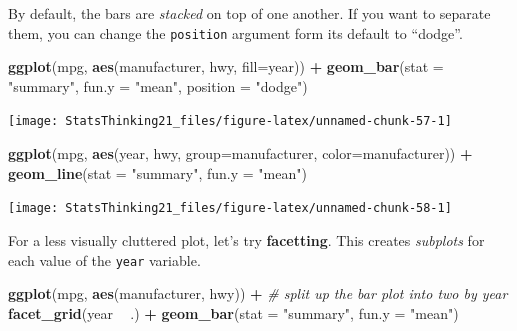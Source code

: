 \documentclass[12pt,]{book}
\newenvironment{Shaded}{\begin{snugshade}}{\end{snugshade}}
\newcommand{\CommentTok}[1]{\textcolor[rgb]{0.56,0.35,0.01}{\textit{#1}}}
\newcommand{\DataTypeTok}[1]{\textcolor[rgb]{0.13,0.29,0.53}{#1}}
\newcommand{\KeywordTok}[1]{\textcolor[rgb]{0.13,0.29,0.53}{\textbf{#1}}}
\newcommand{\NormalTok}[1]{#1}
\newcommand{\OperatorTok}[1]{\textcolor[rgb]{0.81,0.36,0.00}{\textbf{#1}}}
\newcommand{\StringTok}[1]{\textcolor[rgb]{0.31,0.60,0.02}{#1}}
\begin{document}
By default, the bars are \emph{stacked} on top of one another. If you want to separate them, you can change the \texttt{position} argument form its default to ``dodge''.

\begin{Shaded}
\begin{Highlighting}[]
\KeywordTok{ggplot}\NormalTok{(mpg, }\KeywordTok{aes}\NormalTok{(manufacturer, hwy, }\DataTypeTok{fill=}\NormalTok{year)) }\OperatorTok{+}
\StringTok{  }\KeywordTok{geom_bar}\NormalTok{(}\DataTypeTok{stat =} \StringTok{"summary"}\NormalTok{, }
           \DataTypeTok{fun.y =} \StringTok{"mean"}\NormalTok{, }
           \DataTypeTok{position =} \StringTok{"dodge"}\NormalTok{)}
\end{Highlighting}
\end{Shaded}

\texttt{[image: StatsThinking21\_files/figure-latex/unnamed-chunk-57-1]}

\begin{Shaded}
\begin{Highlighting}[]
\KeywordTok{ggplot}\NormalTok{(mpg, }\KeywordTok{aes}\NormalTok{(year, hwy, }
                \DataTypeTok{group=}\NormalTok{manufacturer,}
                \DataTypeTok{color=}\NormalTok{manufacturer)) }\OperatorTok{+}
\StringTok{  }\KeywordTok{geom_line}\NormalTok{(}\DataTypeTok{stat =} \StringTok{"summary"}\NormalTok{, }\DataTypeTok{fun.y =} \StringTok{"mean"}\NormalTok{)}
\end{Highlighting}
\end{Shaded}

\texttt{[image: StatsThinking21\_files/figure-latex/unnamed-chunk-58-1]}

For a less visually cluttered plot, let's try \textbf{facetting}. This creates \emph{subplots} for each value of the \texttt{year} variable.

\begin{Shaded}
\begin{Highlighting}[]
\KeywordTok{ggplot}\NormalTok{(mpg, }\KeywordTok{aes}\NormalTok{(manufacturer, hwy)) }\OperatorTok{+}
\StringTok{  }\CommentTok{# split up the bar plot into two by year}
\StringTok{  }\KeywordTok{facet_grid}\NormalTok{(year }\OperatorTok{~}\StringTok{ }\NormalTok{.) }\OperatorTok{+}\StringTok{ }
\StringTok{  }\KeywordTok{geom_bar}\NormalTok{(}\DataTypeTok{stat =} \StringTok{"summary"}\NormalTok{, }
           \DataTypeTok{fun.y =} \StringTok{"mean"}\NormalTok{)}
\end{Highlighting}
\end{Shaded}
\end{document}
